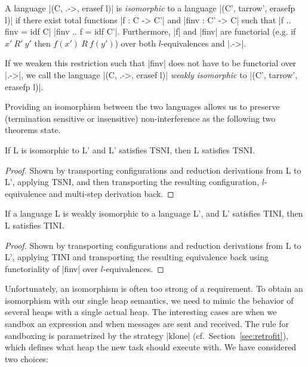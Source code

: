 \begin{definition}
  A language |(C, .->, erasef l)| is \textit{isomorphic} to a
  language |(C', tarrow', erasefp l)| if there exist total functions |f
  : C -> C'| and |finv : C' -> C| such that |f .. finv = idf C| |finv
  .. f = idf C'|.  Furthermore, |f| and |finv| are functorial (e.g. if
  $x'\ R'\ y'$ then $f(x')\ R\ f(y')$) over both
  $l$-equivalences and |.->|.
  
  If we weaken this restriction such that |finv| does
  not have to be functorial over |.->|, we call the
  language |(C, .->, erasef l)| \textit{weakly isomorphic} to
  |(C', tarrow', erasefp l)|.
\end{definition}

Providing an isomorphism between the two languages allows us to
preserve (termination sensitive or insensitive) non-interference
as the following two theorems state.

\begin{theorem}
  \label{thm:iso-tsni}
  If L is isomorphic to L' and L' satisfies TSNI, then
  L satisfies TSNI.
\end{theorem}

\begin{proof}
  Shown by transporting configurations and reduction derivations from
  L to L', applying TSNI, and then transporting the
  resulting configuration, $l$-equivalence and multi-step derivation back.
\end{proof}

\begin{theorem}
  \label{thm:iso-tini}
  If a language L is weakly isomorphic to a language L', and L'
  satisfies TINI, then L satisfies TINI.
\end{theorem}

\begin{proof}
  Shown by transporting configurations and reduction derivations
  from L to L', applying TINI and transporting the resulting
  equivalence back using functoriality of |finv| over $l$-equivalences.
\end{proof}

Unfortunately, an isomorphism is often too strong of a requirement.
To obtain an isomorphism with our single heap semantics, we need to mimic the
behavior of several heaps with a single actual heap.
The interesting cases are when we sandbox
an expression and when messages are sent and received.
The rule for sandboxing is
parametrized by the strategy |klone| (cf.\ Section~\ref{sec:retrofit}),
which defines what heap the new task
should execute with.  We have considered two choices:

